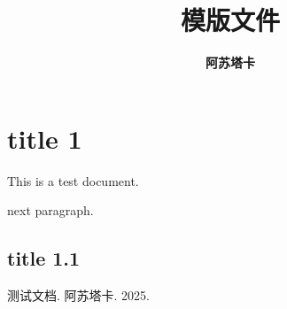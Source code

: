 \documentclass[a4paper]{ctexart}
\title{\textbf{模版文件}}
\author{\textbf{阿苏塔卡}}
\affil{（学号，班级，学校）}
\date{}
\begin{document}
\maketitle
\thispagestyle{empty}
\begin{abstract}
\end{abstract}
\begin{description}
\setlength{\leftskip}{2em}
\item[关键词]
\end{description}
\section{title 1}
This is a test document.\cite{1}
\par next paragraph.
\subsection{title 1.1}
\begin{thebibliography}{114514}
测试文档. 阿苏塔卡. 2025.
\end{thebibliography}
\end{document}
